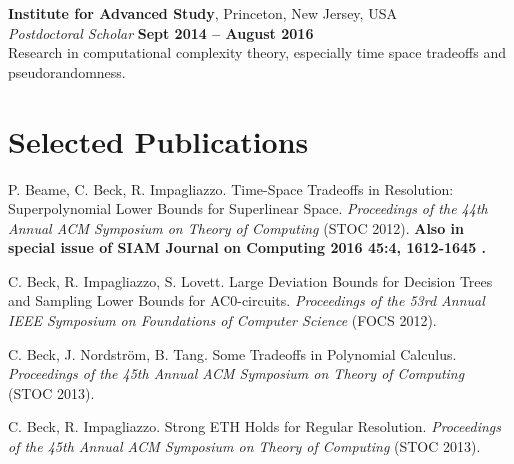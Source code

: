 \documentclass[margin,line]{resume}
\begin{document}
\begin{resume}
    \textbf{Institute for Advanced Study}, Princeton, New Jersey, USA \vspace{2mm}\\\vspace{1mm}%
    \textsl{Postdoctoral Scholar} \hfill \textbf{Sept 2014 -- August 2016}\\
    Research in computational complexity theory, especially time space tradeoffs and pseudorandomness.

    \section{\mysidestyle Selected Publications}

    P. Beame, C. Beck, R. Impagliazzo. Time-Space Tradeoffs in Resolution: Superpolynomial Lower Bounds for Superlinear Space. \textsl{Proceedings of the 44th Annual ACM Symposium on Theory of Computing } (STOC 2012). {\bf Also in special issue of SIAM Journal on Computing 2016 45:4, 1612-1645 .}

\vspace{-2mm}
    C. Beck, R. Impagliazzo, S. Lovett. Large Deviation Bounds for Decision Trees and Sampling Lower Bounds for AC0-circuits. \textsl{Proceedings of the 53rd Annual IEEE Symposium on Foundations of Computer Science} (FOCS 2012). 

\vspace{-2mm}
    C. Beck, J. Nordstr{\"o}m, B. Tang. Some Tradeoffs in Polynomial Calculus. 
    \textsl{Proceedings of the 45th Annual ACM Symposium on Theory of Computing } (STOC 2013).
    

\vspace{-2mm}
    C. Beck, R. Impagliazzo. Strong ETH Holds for Regular Resolution.
    \textsl{Proceedings of the 45th Annual ACM Symposium on Theory of Computing } (STOC 2013).







\end{resume}
\end{document}
